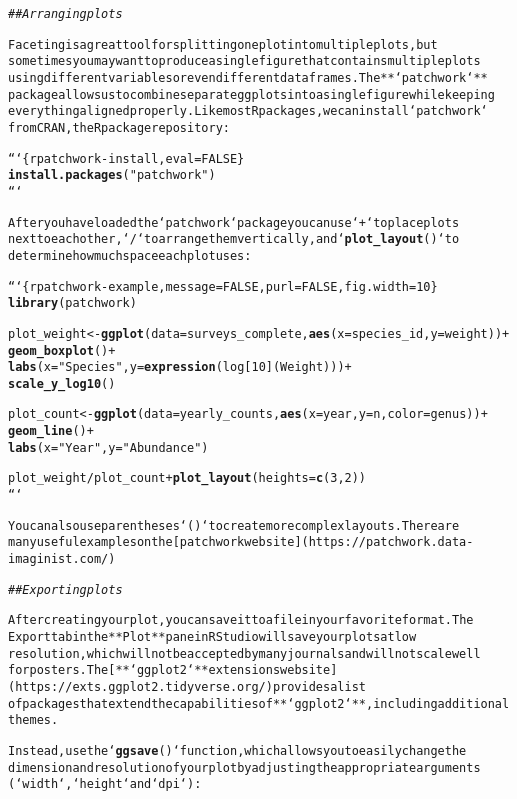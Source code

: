\documentclass{article}\usepackage[]{graphicx}\usepackage[]{xcolor}
\makeatletter
\newcommand{\hlstr}[1]{\textcolor[rgb]{0.192,0.494,0.8}{#1}}%
\newcommand{\hlcom}[1]{\textcolor[rgb]{0.678,0.584,0.686}{\textit{#1}}}%
\newcommand{\hlkwd}[1]{\textcolor[rgb]{0.737,0.353,0.396}{\textbf{#1}}}%
\newenvironment{kframe}{%
 \def\at@end@of@kframe{}%
 \ifinner\ifhmode%
  \def\at@end@of@kframe{\end{minipage}}%
  \begin{minipage}{\columnwidth}%
 \fi\fi%
 \def\FrameCommand##1{\hskip\@totalleftmargin \hskip-\fboxsep
 \colorbox{shadecolor}{##1}\hskip-\fboxsep
     \hskip-\linewidth \hskip-\@totalleftmargin \hskip\columnwidth}%
 \MakeFramed {\advance\hsize-\width
   \@totalleftmargin\z@ \linewidth\hsize
   \@setminipage}}%
 {\par\unskip\endMakeFramed%
 \at@end@of@kframe}
\newenvironment{knitrout}{}{} %
\makeatother
\begin{document}
\begin{knitrout}
\begin{kframe}
\begin{alltt}
\hlcom{## Arranging plots}

Faceting is a great tool for splitting one plot into multiple plots, but
sometimes you may want to produce a single figure that contains multiple plots
using different variables or even different data frames. The **`patchwork`**
package allows us to combine separate ggplots into a single figure while keeping
everything aligned properly. Like most R packages, we can install `patchwork`
from CRAN, the R package repository:

```\{r patchwork-install, eval = FALSE\}
\hlkwd{install.packages}(\hlstr{"patchwork"})
```

After you have loaded the `patchwork` package you can use `+` to place plots
next to each other, `/` to arrange them vertically, and `\hlkwd{plot_layout}()` to
determine how much space each plot uses:

```\{r patchwork-example, message = FALSE, purl = FALSE, fig.width = 10\}
\hlkwd{library}(patchwork)

plot_weight <- \hlkwd{ggplot}(data = surveys_complete, \hlkwd{aes}(x = species_id, y = weight)) +
  \hlkwd{geom_boxplot}() +
  \hlkwd{labs}(x = \hlstr{"Species"}, y = \hlkwd{expression}(log[10](Weight))) +
  \hlkwd{scale_y_log10}()

plot_count <- \hlkwd{ggplot}(data = yearly_counts, \hlkwd{aes}(x = year, y = n, color = genus)) +
  \hlkwd{geom_line}() +
  \hlkwd{labs}(x = \hlstr{"Year"}, y = \hlstr{"Abundance"})

plot_weight / plot_count + \hlkwd{plot_layout}(heights = \hlkwd{c}(3, 2))
```

You can also use parentheses `()` to create more complex layouts. There are
many useful examples on the [patchwork website](https://patchwork.data-imaginist.com/)

\hlcom{## Exporting plots}

After creating your plot, you can save it to a file in your favorite format. The
Export tab in the **Plot** pane in RStudio will save your plots at low
resolution, which will not be accepted by many journals and will not scale well
for posters. The [**`ggplot2`** extensions website](https://exts.ggplot2.tidyverse.org/) provides a list
of packages that extend the capabilities of **`ggplot2`**, including additional
themes.

Instead, use the `\hlkwd{ggsave}()` function, which allows you to easily change the
dimension and resolution of your plot by adjusting the appropriate arguments
(`width`, `height` and `dpi`):


\end{alltt}
\end{kframe}
\end{knitrout}
\end{document}
